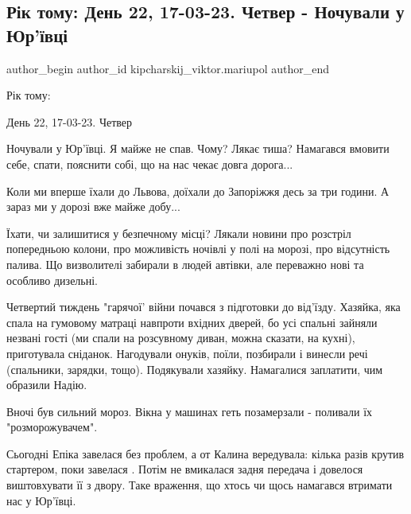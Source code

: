  
 
 
 
 

\subsection{Рік тому: День 22, 17-03-23. Четвер - Ночували у Юр'ївці}
\label{sec:17_03_2023.fb.kipcharskij_viktor.mariupol.1.r_k_tomu__den_22__17}

\ifcmt
 author_begin
   author_id kipcharskij_viktor.mariupol
 author_end
\fi

Рік тому:

День 22, 17-03-23. Четвер

Ночували у Юр'ївці. Я майже не спав. Чому? Лякає тиша? Намагався вмовити себе,
спати, пояснити собі, що на нас чекає довга дорога... 

Коли ми вперше їхали до Львова, доїхали до Запоріжжя десь за три години. А
зараз ми у дорозі вже майже добу...

 Їхати, чи залишитися у безпечному місці? Лякали новини про розстріл
 попередньою колони, про можливість ночівлі у полі на морозі, про відсутність
 палива. Що визволителі забирали в людей автівки, але переважно нові та
 особливо дизельні.

Четвертий тиждень "гарячої' війни почався з підготовки до від'їзду. Хазяйка,
яка спала на гумовому матраці навпроти вхідних дверей, бо усі спальні зайняли
незвані гості (ми спали на розсувному диван,  можна сказати, на кухні),
приготувала сніданок. Нагодували онуків, поїли, позбирали і винесли речі
(спальники, зарядки, тощо). Подякували хазяйку. Намагалися заплатити, чим
образили Надію.

Вночі був сильний мороз. Вікна у машинах геть позамерзали - поливали їх
"розморожувачем".

Сьогодні Епіка завелася без проблем, а от Калина вередувала: кілька разів
крутив стартером, поки завелася . Потім не вмикалася задня передача і довелося
виштовхувати її з двору. Таке враження, що хтось чи щось намагався втримати нас
у Юр'ївці.

